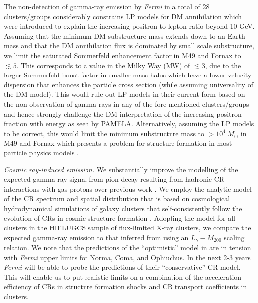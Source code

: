 \documentclass[10pt,aps,pra,reprint,amsmath,amsfonts,amssymb,showpacs,nofootinbib,floatfix]{revtex4-1}
\newcommand{\Fermi}{{\em Fermi}\xspace}
\newcommand{\msun}{M_\odot}
\newcommand{\mvir}{M_{200}}
\begin{document}
The non-detection of gamma-ray emission by \Fermi in a total of 28
clusters/groups considerably constrains LP models for DM annihilation which were
introduced to explain the increasing positron-to-lepton ratio beyond 10
GeV. Assuming that the minimum DM substructure mass extends down to an Earth
mass and that the DM annihilation flux is dominated by small scale substructure,
we limit the saturated Sommerfeld enhancement factor in M49 and Fornax to
$\lesssim 5$. This corresponds to a value in the Milky Way (MW) of $\lesssim3$,
due to the larger Sommerfeld boost factor in smaller mass halos which have a
lower velocity dispersion that enhances the particle cross section (while
assuming universality of the DM model). This would rule out LP models in their
current form based on the non-observation of gamma-rays in any of the
fore-mentioned clusters/groups and hence strongly challenge the DM
interpretation of the increasing positron fraction with energy as seen by
PAMELA. Alternatively, assuming the LP models to be correct, this would limit
the minimum substructure mass to $>10^4~\msun$ in M49 and Fornax which presents
a problem for structure formation in most particle physics models
\cite{2009NJPh...11j5027B}.

{\em Cosmic ray-induced emission.} We substantially improve the modelling of the
expected gamma-ray signal from pion-decay resulting from hadronic CR
interactions with gas protons over previous work \cite{2010ApJ...717L..71A}. We
employ the analytic model of the CR spectrum and spatial distribution that is
based on cosmological hydrodynamical simulations of galaxy clusters that
self-consistently follow the evolution of CRs in cosmic structure formation
\cite{2010MNRAS.409..449P}. Adopting the model for all clusters in the HIFLUGCS
sample of flux-limited X-ray clusters, we compare the expected gamma-ray
emission to that inferred from using an $L_\gamma-\mvir$ scaling relation. We note
that the predictions of the ``optimistic'' model in \cite{2010MNRAS.409..449P}
are in tension with \Fermi upper limits for Norma, Coma, and Ophiuchus. In the
next 2-3 years \Fermi will be able to probe the predictions of their
``conservative'' CR model. This will enable us to put realistic limits on a
combination of the acceleration efficiency of CRs in structure formation shocks
and CR transport coefficients in clusters.
\end{document}
